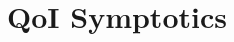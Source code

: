 \documentclass[conference]{IEEEtran}
\begin{document}
%
\title{QoI Symptotics}

\IEEEoverridecommandlockouts




%
\end{document}
